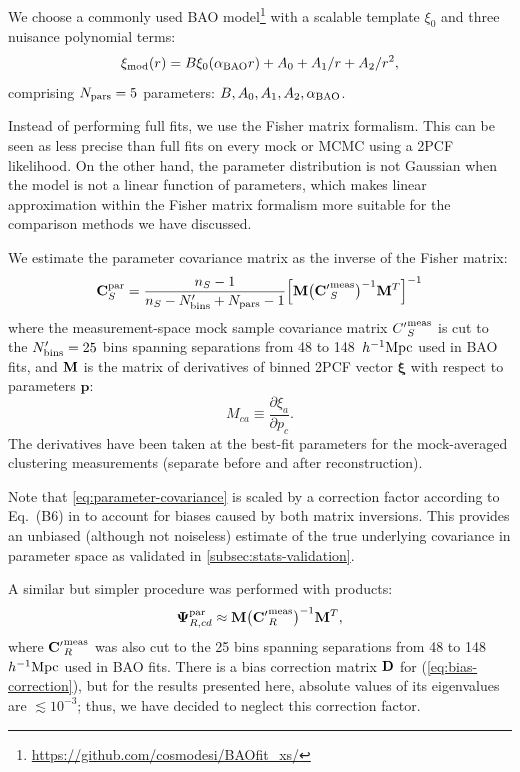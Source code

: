 We choose a commonly used BAO model\footnote{\url{https://github.com/cosmodesi/BAOfit\_xs/}} \citep{SDSS3-Ross17,BOSS-DR14-Ata18} with a scalable template $\xi_0$ and three nuisance polynomial terms:
\begin{equation} \label{eq:BAO-model}
    \xi_{\rm mod}(r) = B\xi_0(\alpha_{\rm BAO} r) + A_0 + A_1/r + A_2/r^2,
\end{equation}
comprising $N_{\rm pars}=5$ parameters: $B, A_0, A_1, A_2, \alpha_{\rm BAO}$.

Instead of performing full fits, we use the Fisher matrix formalism.
This can be seen as less precise than full fits on every mock or MCMC using a 2PCF likelihood.
On the other hand, the parameter distribution is not Gaussian when the model is not a linear function of parameters, which makes linear approximation within the Fisher matrix formalism more suitable for the comparison methods we have discussed.

We estimate the parameter covariance matrix as the inverse of the Fisher matrix:
\begin{equation} \label{eq:parameter-covariance}
{\bf C}_S^{\rm par} = \frac{n_S-1}{n_S-N'_{\rm bins}+N_{\rm pars}-1} {\left[ {\bf M} {\left( {\bf C'}^{\rm meas}_S \right)}^{-1} {\bf M}^T \right]}^{-1}
\end{equation}
where the measurement-space mock sample covariance matrix ${C'}^{\rm meas}_S$ is cut to the $N'_{\rm bins}=25$ bins spanning separations from 48 to 148~$h^{-1}{\rm Mpc}$ used in BAO fits, and ${\bf M}$ is the matrix of derivatives of binned 2PCF vector $\bm \xi$ with respect to parameters $\bm p$:
\begin{equation}
M_{ca} \equiv \frac{\partial \xi_a}{\partial p_c}.
\end{equation}
The derivatives have been taken at the best-fit parameters for the mock-averaged clustering measurements (separate before and after reconstruction).

Note that \cref{eq:parameter-covariance} is scaled by a correction factor according to Eq.~(B6) in \cite{density-split-clustering-constrain-nuLCDM} to account for biases caused by both matrix inversions.
This provides an unbiased (although not noiseless) estimate of the true underlying covariance in parameter space as validated in \cref{subsec:stats-validation}.

A similar but simpler procedure was performed with \rascalc{} products:
\begin{equation} \label{eq:rascalc-parameter-prec}
{\bf \Psi}^{\rm par}_{R,cd} \approx {\bf M} {\left( {\bf C'}^{\rm meas}_R \right)}^{-1} {\bf M}^T,
\end{equation}
where ${\bf C'}^{\rm meas}_R$ was also cut to the 25 bins spanning separations from 48 to 148~$h^{-1}{\rm Mpc}$ used in BAO fits.
There is a bias correction matrix $\bf D$ for \rascalc{} (\cref{eq:bias-correction}), but for the results presented here, absolute values of its eigenvalues are $\lesssim 10^{-3}$; thus, we have decided to neglect this correction factor.

